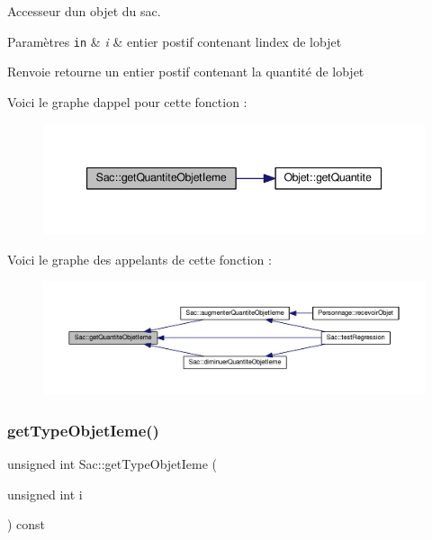 Accesseur d\textquotesingle{}un objet du sac. 


\begin{DoxyParams}[1]{Paramètres}
\mbox{\tt in}  & {\em i} & entier postif contenant l\textquotesingle{}index de l\textquotesingle{}objet \\
\hline
\end{DoxyParams}
\begin{DoxyReturn}{Renvoie}
retourne un entier postif contenant la quantité de l\textquotesingle{}objet 
\end{DoxyReturn}
Voici le graphe d\textquotesingle{}appel pour cette fonction \+:\nopagebreak
\begin{figure}[H]
\begin{center}
\leavevmode
\includegraphics[width=347pt]{class_sac_a09dbee93f5c31ed563d87171de923d8c_cgraph}
\end{center}
\end{figure}
Voici le graphe des appelants de cette fonction \+:\nopagebreak
\begin{figure}[H]
\begin{center}
\leavevmode
\includegraphics[width=350pt]{class_sac_a09dbee93f5c31ed563d87171de923d8c_icgraph}
\end{center}
\end{figure}
\mbox{\label{class_sac_a051e0f7f295c899a0af5cfb8f82b0483}} 
\subsubsection{\texorpdfstring{get\+Type\+Objet\+Ieme()}{getTypeObjetIeme()}}
{\footnotesize\ttfamily unsigned int Sac\+::get\+Type\+Objet\+Ieme (\begin{DoxyParamCaption}\item[{unsigned int}]{i }\end{DoxyParamCaption}) const}



